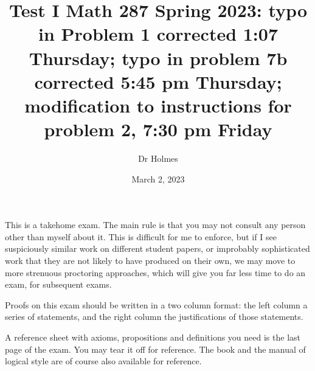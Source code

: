 \documentclass[12pt]{article}
\title{Test I Math 287 Spring 2023:  typo in Problem 1  corrected 1:07 Thursday; typo in problem 7b corrected 5:45 pm Thursday;  modification to instructions for problem 2, 7:30 pm Friday}
\author{Dr Holmes}
\date{March 2, 2023}
\begin{document}
\maketitle

This is a takehome exam. The main rule is that you may not consult any person other than myself about it.  This is difficult for me to enforce, but if I see
suspiciously similar work on different student papers, or improbably sophisticated work that they are not likely to have produced on their own, we may move to more strenuous proctoring approaches, which will give you far less time to do an exam, for subsequent exams.

Proofs on this exam should be written in a two column format:  the left column a series of statements, and the right column the justifications of those statements.

A reference sheet with axioms, propositions and definitions you need is the last page of the exam.  You may tear it off for reference.  The book and the manual of logical style are of course also available for reference.



\newpage
\end{document}
